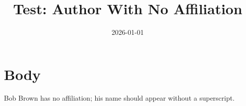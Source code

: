 \documentclass{article}
\title{Test: Author With No Affiliation}
\date{2026-01-01}
\begin{document}
\maketitle
\section{Body}
Bob Brown has no affiliation; his name should appear without a superscript.
\end{document}
